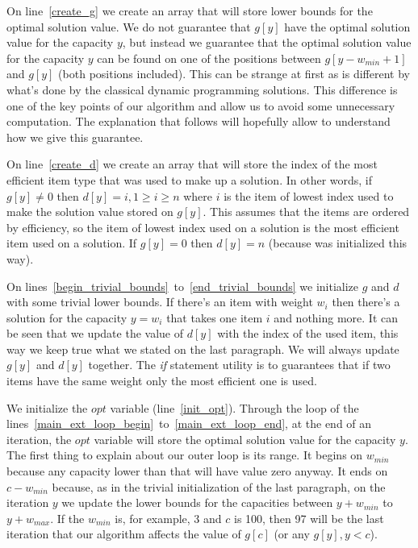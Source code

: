 \documentclass[12pt]{article}
\begin{document}
On line~\ref{create_g} we create an array that will store lower bounds for the optimal solution value. We do not guarantee that \(g[y]\) have the optimal solution value for the capacity \(y\), but instead we guarantee that the optimal solution value for the capacity \(y\) can be found on one of the positions between \(g[y-w_{min}+1]\) and \(g[y]\) (both positions included). This can be strange at first as is different by what's done by the classical dynamic programming solutions. This difference is one of the key points of our algorithm and allow us to avoid some unnecessary computation. The explanation that follows will hopefully allow to understand how we give this guarantee.

On line~\ref{create_d} we create an array that will store the index of the most efficient item type that was used to make up a solution. In other words, if \(g[y] \neq 0\) then \(d[y] = i, 1 \geq i \geq n\) where \(i\) is the item of lowest index used to make the solution value stored on \(g[y]\). This assumes that the items are ordered by efficiency, so the item of lowest index used on a solution is the most efficient item used on a solution. If \(g[y] = 0\) then \(d[y] = n\) (because was initialized this way).

On lines~\ref{begin_trivial_bounds}~to~\ref{end_trivial_bounds} we initialize \(g\) and \(d\) with some trivial lower bounds. If there's an item with weight \(w_i\) then there's a solution for the capacity \( y = w_i\) that takes one item \(i\) and nothing more. It can be seen that we update the value of \(d[y]\) with the index of the used item, this way we keep true what we stated on the last paragraph. We will always update \(g[y]\) and \(d[y]\) together. The \textit{if} statement utility is to guarantees that if two items have the same weight only the most efficient one is used.

We initialize the \(opt\) variable (line~\ref{init_opt}). Through the loop of the lines~\ref{main_ext_loop_begin}~to~\ref{main_ext_loop_end}, at the end of an iteration, the \(opt\) variable will store the optimal solution value for the capacity \(y\). The first thing to explain about our outer loop is its range. It begins on \(w_{min}\) because any capacity lower than that will have value zero anyway. It ends on \(c-w_{min}\) because, as in the trivial initialization of the last paragraph, on the iteration \(y\) we update the lower bounds for the capacities between \(y+w_{min}\) to \(y+w_{max}\). If the \(w_{min}\) is, for example, 3 and \(c\) is 100, then 97 will be the last iteration that our algorithm affects the value of \(g[c]\) (or any \(g[y], y < c\)). 
\end{document}
